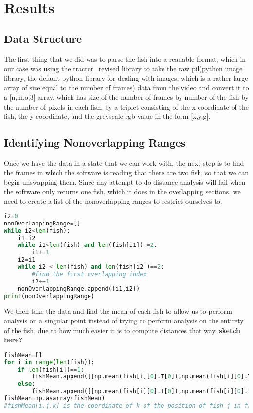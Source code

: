 \documentclass[12pt]{article}
\begin{document}
\section{Results}

\subsection{Data Structure}
The first thing that we did was to parse the fish into a readable format, which in our case was using the tractor\_revised library to take the raw pil(python image library, the default python library for dealing with images, which is a rather large array of size equal to the number of frames) data from the video and convert it to a [n,m,o,3] array, which has size of the number of frames by number of the fish by the number of pixels in each fish, by a triplet consisting of the x coordinate of the fish, the y coordinate, and the greyscale rgb value in the form [x,y,g]. 

\subsection{Identifying Nonoverlapping Ranges}


Once we have the data in a state that we can work with, the next step is to find the frames in which the software is reading that there are two fish, so that we can begin unswapping them. Since any attempt to do distance analysis will fail when the software only returns one fish, which it does in the overlapping sections, we need to create a list of the nonoverlapping ranges to restrict ourselves to.
\begin{lstlisting}[language=Python]
i2=0
nonOverlappingRange=[]
while i2<len(fish):
    i1=i2
    while i1<len(fish) and len(fish[i1])!=2:
        i1+=1
    i2=i1
    while i2 < len(fish) and len(fish[i2])==2:
        #find the first overlapping index
        i2+=1
    nonOverlappingRange.append([i1,i2])
print(nonOverlappingRange)
\end{lstlisting}

We then take the data and find the mean of each fish to allow us to perform analysis on a singular point instead of trying to perform analysis on the entirety of the fish, due to how much easier it is to compute distances that way. \textbf{sketch here?}
\begin{lstlisting}[language=Python]
fishMean=[]
for i in range(len(fish)):
    if len(fish[i])==1:
        fishMean.append([[np.mean(fish[i][0].T[0]),np.mean(fish[i][0].T[1])],[np.mean(fish[i][0].T[0]),np.mean(fish[i][0].T[1])]])
    else:
        fishMean.append([[np.mean(fish[i][0].T[0]),np.mean(fish[i][0].T[1])],[np.mean(fish[i][1].T[0]),np.mean(fish[i][1].T[1])]])
fishMean=np.asarray(fishMean)
#fishMean[i.j.k] is the coordinate of k of the position of fish j in frame i
\end{lstlisting}
\end{document}
